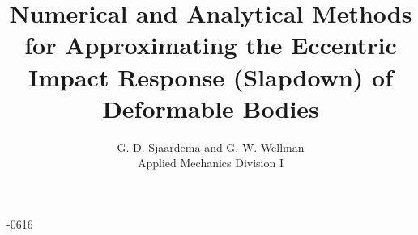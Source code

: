\title{Numerical and Analytical Methods for Approximating the 
Eccentric Impact Response (Slapdown) of Deformable Bodies}
\author{G. D. Sjaardema and G. W. Wellman\\
        Applied Mechanics Division I\\
        \SNLA}
-0616
\makesandtitle
